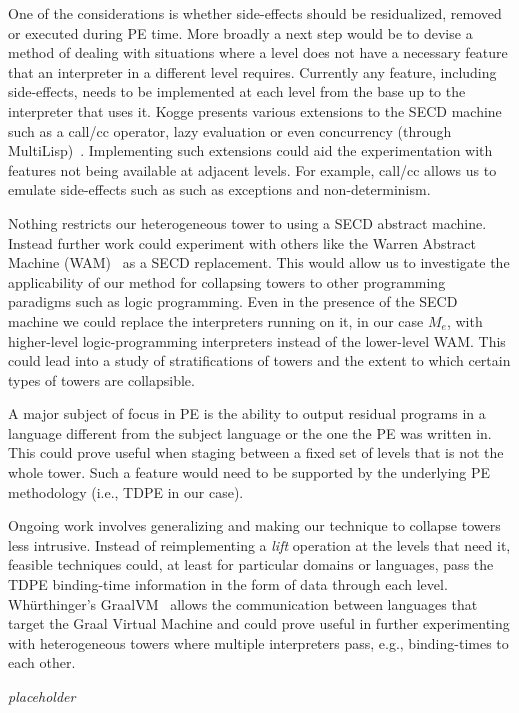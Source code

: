 \documentclass[sigplan,anonymous,review]{acmart}
\newcommand{\mevl}{$M_{e}$}
\theoremstyle{definition}
\begin{document}
One of the considerations is whether side-effects should be residualized, removed or executed during PE time. More broadly a next step would be to devise a method of dealing with situations where a level does not have a necessary feature that an interpreter in a different level requires.
Currently any feature, including side-effects, needs to be implemented at each level from the base up to the interpreter that uses it.
Kogge presents various extensions to the SECD machine such as a call/cc operator, lazy evaluation or even concurrency (through MultiLisp)~\cite{kogge1990architecture}. Implementing such extensions could aid the experimentation with features not being available at adjacent levels. For example, call/cc allows us to emulate side-effects such as such as exceptions and non-determinism.

Nothing restricts our heterogeneous tower to using a SECD abstract machine. Instead further work could experiment with others like the Warren Abstract Machine (WAM)~\cite{warren1983abstract} as a SECD replacement. This would allow us to investigate the applicability of our method for collapsing towers to other programming paradigms such as logic programming. Even in the presence of the SECD machine we could replace the interpreters running on it, in our case \mevl, with higher-level logic-programming interpreters instead of the lower-level WAM. This could lead into a study of stratifications of towers and the extent to which certain types of towers are collapsible.

A major subject of focus in PE is the ability to output residual programs in a language different from the subject language or the one the PE was written in. This could prove useful when staging between a fixed set of levels that is not the whole tower. Such a feature would need to be supported by the underlying PE methodology (i.e., TDPE in our case).

Ongoing work involves generalizing and making our technique to collapse towers less intrusive. Instead of reimplementing a \textit{lift} operation at the levels that need it, feasible techniques could, at least for particular domains or languages, pass the TDPE binding-time information in the form of data through each level. Wh{\"u}rthinger's GraalVM~\cite{wurthinger2013one} allows the communication between languages that target the Graal Virtual Machine and could prove useful in further experimenting with heterogeneous towers where multiple interpreters pass, e.g., binding-times to each other.

\begin{acks}
\textit{placeholder}
\end{acks}




\end{document}
